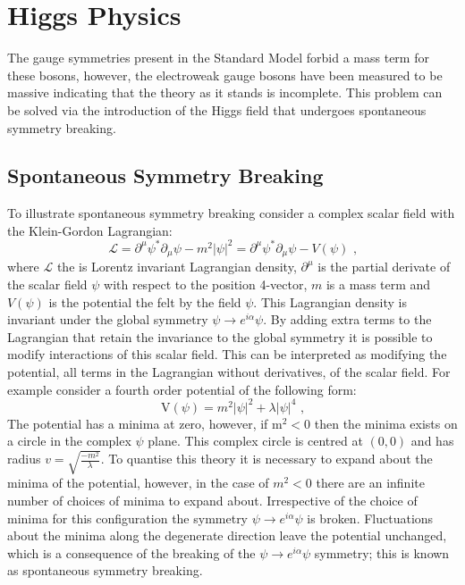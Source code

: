 
\section{Higgs Physics}
\label{sec:higgsphysics}
The gauge symmetries present in the Standard Model forbid a mass term for these bosons, however, the electroweak gauge bosons have been measured to be massive indicating that the theory as it stands is incomplete.  This problem can be solved via the introduction of the Higgs field that undergoes spontaneous symmetry breaking.


\subsection{Spontaneous Symmetry Breaking}
\label{sec:ssb}
To illustrate spontaneous symmetry breaking consider a complex scalar field \psi with the Klein-Gordon Lagrangian:
%
\begin{equation}
\mathcal{L} = \partial^{\mu} \psi^{*} \partial_{\mu} \psi -m^{2} |\psi|^{2} = \partial^{\mu} \psi^{*} \partial_{\mu} \psi - V(\psi) \text{ ,}
\end{equation}
%
\noindent where $\mathcal{L}$ the is Lorentz invariant Lagrangian density, $\partial^{\mu}$ is the partial derivate of the scalar field $\psi$ with respect to the position 4-vector, $m$ is a mass term and $V(\psi)$ is the potential the felt by the field $\psi$.  This Lagrangian density is invariant under the global symmetry $\psi \rightarrow e^{i\alpha} \psi$.  By adding extra terms to the Lagrangian that retain the invariance to the global symmetry it is possible to modify interactions of this scalar field.  This can be interpreted as modifying the potential, all terms in the Lagrangian without derivatives, of the scalar field.  For example consider a fourth order potential of the following form:
%
\begin{equation}
\text{V}(\psi) = m^{2}|\psi|^{2} + \lambda |\psi|^{4} \text{ ,}
\end{equation}
%
\noindent The potential has a minima at zero, however, if $\text{m}^{2} < 0$ then the minima exists on a circle in the complex $\psi$ plane.  This complex circle is centred at $(0,0)$ and has radius $v = \sqrt{\frac{-m^{2}}{\lambda}}$.  To quantise this theory it is necessary to expand about the minima of the potential, however, in the case of $m^{2} < 0$ there are an infinite number of choices of minima to expand about.  Irrespective of the choice of minima for this configuration the symmetry $\psi \rightarrow e^{i\alpha} \psi$ is broken.  Fluctuations about the minima along the degenerate direction leave the potential unchanged, which is a consequence of the breaking of the $\psi \rightarrow e^{i\alpha} \psi$ symmetry; this is known as spontaneous symmetry breaking.

